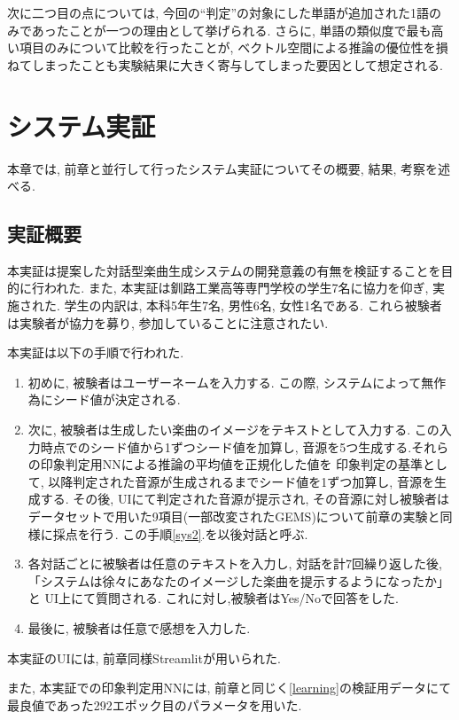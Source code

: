 \documentclass[a4paper,11pt,dvipdfmx]{jreport}
\begin{document}
次に二つ目の点については, 今回の``判定''の対象にした単語が追加された1語のみであったことが一つの理由として挙げられる.
さらに, 単語の類似度で最も高い項目のみについて比較を行ったことが, ベクトル空間による推論の優位性を損ねてしまったことも実験結果に大きく寄与してしまった要因として想定される.

\newpage
\chapter{システム実証}
本章では, 前章と並行して行ったシステム実証についてその概要, 結果, 考察を述べる.
\section{実証概要}
本実証は提案した対話型楽曲生成システムの開発意義の有無を検証することを目的に行われた.
また, 本実証は釧路工業高等専門学校の学生7名に協力を仰ぎ, 実施された.
学生の内訳は, 本科5年生7名, 男性6名, 女性1名である.
これら被験者は実験者が協力を募り, 参加していることに注意されたい.

本実証は以下の手順で行われた.
\begin{enumerate}
  \item 初めに, 被験者はユーザーネームを入力する.
        この際, システムによって無作為にシード値が決定される.
  \item 次に, 被験者は生成したい楽曲のイメージをテキストとして入力する.
        この入力時点でのシード値から1ずつシード値を加算し,
        音源を5つ生成する.それらの印象判定用NNによる推論の平均値を正規化した値を
        印象判定の基準として, 以降判定された音源が生成されるまでシード値を1ずつ加算し, 
        音源を生成する. その後, UIにて判定された音源が提示され, その音源に対し被験者は
        データセットで用いた9項目(一部改変されたGEMS)について前章の実験と同様に採点を行う.
        この手順\ref{sys2}.を以後対話と呼ぶ.
        \label{sys2}
  \item 各対話ごとに被験者は任意のテキストを入力し, 対話を計7回繰り返した後, 
        「システムは徐々にあなたのイメージした楽曲を提示するようになったか」と
        UI上にて質問される.
        これに対し,被験者はYes/Noで回答をした.
  \item 最後に, 被験者は任意で感想を入力した.
\end{enumerate}

本実証のUIには, 前章同様Streamlitが用いられた.

また, 本実証での印象判定用NNには, 前章と同じく\ref{learning}の検証用データにて最良値であった292エポック目のパラメータを用いた.
\end{document}
